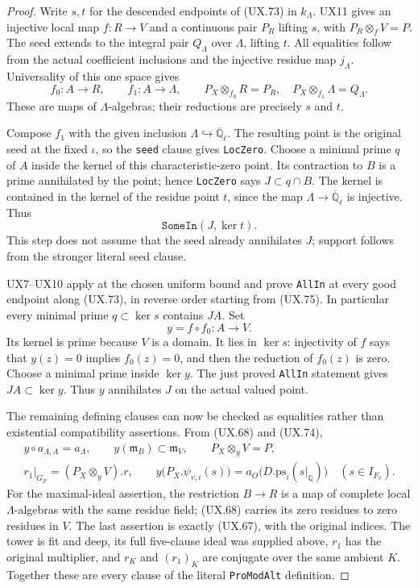 \begin{proof}
Write $s,t$ for the descended endpoints of
(UX.73) in $k_\Lambda$.  UX11 gives an
injective local map $f:R\to V$ and a
continuous pair $P_R$ lifting $s$, with
$P_R\otimes_fV=P$.  The seed extends to
the integral pair $Q_\Lambda$ over
$\Lambda$, lifting $t$.
All equalities follow from the actual
coefficient inclusions and the injective
residue map $j_\Lambda$.  Universality of
this one space gives
\[
 f_0:A\longrightarrow R,
 \qquad f_1:A\longrightarrow\Lambda,
 \qquad P_X\otimes_{f_0}R=P_R,
 \quad P_X\otimes_{f_1}\Lambda=Q_\Lambda.
 \tag{UX.74}
\]
These are maps of $\Lambda$-algebras; their
reductions are precisely $s$ and $t$.

Compose $f_1$ with the given inclusion
$\Lambda\hookrightarrow\overline{\mathbb Q}_\ell$.
The resulting point is the original seed at
the fixed $\iota$, so the \texttt{seed}
clause gives \texttt{LocZero}.  Choose a
minimal prime $q$ of $A$ inside the kernel
of this characteristic-zero point.
Its contraction to $B$ is a prime annihilated
by the point; hence \texttt{LocZero} says
$J\subset q\cap B$.
The kernel is contained in the kernel of
the residue point $t$, since the map
$\Lambda\to\overline{\mathbb Q}_\ell$
is injective.  Thus
\[
 \mathtt{SomeIn}(J,\ker t).
 \tag{UX.75}
\]
This step does not assume that the seed
already annihilates $J$; support follows
from the stronger literal seed clause.

UX7--UX10 apply at the chosen uniform
bound and prove \texttt{AllIn} at every
good endpoint along (UX.73), in reverse
order starting from (UX.75).  In particular
every minimal prime $q\subset\ker s$
contains $JA$.
Set
\[
 y=f\circ f_0:A\longrightarrow V.
 \tag{UX.76}
\]
Its kernel is prime because $V$ is a
domain.  It lies in $\ker s$: injectivity
of $f$ says that $y(z)=0$ implies
$f_0(z)=0$, and then the reduction of
$f_0(z)$ is zero.  Choose a minimal prime
inside $\ker y$.  The just proved
\texttt{AllIn} statement gives
$JA\subset\ker y$.
Thus $y$ annihilates $J$ on the actual
valued point.

The remaining defining clauses can now
be checked as equalities rather than
existential compatibility assertions.
From (UX.68) and (UX.74),
\[
 \begin{gathered}
 y\circ a_{\Lambda,A}=a_\Lambda,
 \qquad y(\mathfrak m_B)\subset\mathfrak m_V,
 \qquad P_X\otimes_yV=P,\\
 r_1|_{G_F}=(P_X\otimes_yV).r,\qquad
 y\bigl(P_X.\psi_{v,i}(s)\bigr)
    =a_O\bigl(D.\mathrm{ps}_i(s|_{\mathbb Q})\bigr)
       \quad(s\in I_{F_v}).
 \end{gathered}
 \tag{UX.77}
\]
For the maximal-ideal assertion, the
restriction $B\to R$ is a map of
complete local $\Lambda$-algebras with
the same residue field; (UX.68) carries
its zero residues to zero residues in
$V$.  The last assertion is exactly
(UX.67), with the original indices.
The tower is fit and deep, its full
five-clause ideal was supplied above,
$r_1$ has the original multiplier, and
$r_K$ and $(r_1)_K$ are conjugate over
the same ambient $K$.  Together these
are every clause of the literal
\texttt{ProModAlt} definition.


\end{proof}
